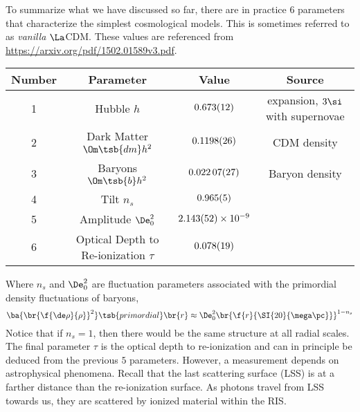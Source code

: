 \documentclass{article}
\begin{document}
To summarize what we have discussed so far, there are in practice $6$ parameters that characterize the simplest cosmological models. This is sometimes referred to as \textit{vanilla} $\La$CDM. These values are referenced from \url{https://arxiv.org/pdf/1502.01589v3.pdf}.
\begin{center}
\begin{tabular}{|c|c|c|c|}
    \hline
    Number & Parameter & Value & Source \\
    \hline
    1 & Hubble $h$ & $\SI{0.673\pm0.012}{}$ & expansion, $3\si$ with supernovae \\
    2 & Dark Matter $\Om\tsb{dm}h^2$ & $\SI{0.1198\pm0.0026}{}$ & CDM density \\
    3 & Baryons $\Om\tsb{b}h^2$ & $\SI{0.02207\pm0.00027}{}$ & Baryon density \\
    4 & Tilt $n_s$ & $\SI{0.965\pm0.005}{}$ &  \\
    5 & Amplitude $\De_0^2$ & ${\SI{2.143\pm0.052}{}} \times \SI{e-9}{}$ &  \\
    6 & Optical Depth to Re-ionization $\tau$ & ${\SI{0.078\pm0.019}{}}$ &  \\
    \hline
\end{tabular}
\end{center}

Where $n_s$ and $\De_0^2$ are fluctuation parameters associated with the primordial density fluctuations of baryons,
\[ \ba{\br{\f{\de \rho}{\rho}}^2}\tsb{primordial}\br{r} \approx \De_0^2 \br{\f{r}{\SI{20}{\mega\pc}}}^{1-n_s} \]
Notice that if $n_s = 1$, then there would be the same structure at all radial scales. \\

The final parameter $\tau$ is the optical depth to re-ionization and can in principle be deduced from the previous $5$ parameters. However, a measurement depends on astrophysical phenomena. Recall that the last scattering surface (LSS) is at a farther distance than the re-ionization surface. As photons travel from LSS towards us, they are scattered by ionized material within the RIS.

\begin{center}
\end{center}
\end{document}
